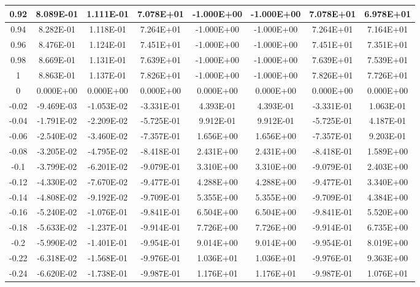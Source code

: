 \documentclass{article}
\begin{document}
\begin{center}
\begin{longtable}{|c|c|c|c|c|c|c|c|}
        0.92 & 8.089E-01 & 1.111E-01 & 7.078E+01 & -1.000E+00 & -1.000E+00 & 7.078E+01 & 6.978E+01 \\ \hline
        0.94 & 8.282E-01 & 1.118E-01 & 7.264E+01 & -1.000E+00 & -1.000E+00 & 7.264E+01 & 7.164E+01 \\ \hline
        0.96 & 8.476E-01 & 1.124E-01 & 7.451E+01 & -1.000E+00 & -1.000E+00 & 7.451E+01 & 7.351E+01 \\ \hline
        0.98 & 8.669E-01 & 1.131E-01 & 7.639E+01 & -1.000E+00 & -1.000E+00 & 7.639E+01 & 7.539E+01 \\ \hline
        1 & 8.863E-01 & 1.137E-01 & 7.826E+01 & -1.000E+00 & -1.000E+00 & 7.826E+01 & 7.726E+01 \\ \hline
        0 & 0.000E+00 & 0.000E+00 & 0.000E+00 & 0.000E+00 & 0.000E+00 & 0.000E+00 & 0.000E+00 \\ \hline
        -0.02 & -9.469E-03 & -1.053E-02 & -3.331E-01 & 4.393E-01 & 4.393E-01 & -3.331E-01 & 1.063E-01 \\ \hline
        -0.04 & -1.791E-02 & -2.209E-02 & -5.725E-01 & 9.912E-01 & 9.912E-01 & -5.725E-01 & 4.187E-01 \\ \hline
        -0.06 & -2.540E-02 & -3.460E-02 & -7.357E-01 & 1.656E+00 & 1.656E+00 & -7.357E-01 & 9.203E-01 \\ \hline
        -0.08 & -3.205E-02 & -4.795E-02 & -8.418E-01 & 2.431E+00 & 2.431E+00 & -8.418E-01 & 1.589E+00 \\ \hline
        -0.1 & -3.799E-02 & -6.201E-02 & -9.079E-01 & 3.310E+00 & 3.310E+00 & -9.079E-01 & 2.403E+00 \\ \hline
        -0.12 & -4.330E-02 & -7.670E-02 & -9.477E-01 & 4.288E+00 & 4.288E+00 & -9.477E-01 & 3.340E+00 \\ \hline
        -0.14 & -4.808E-02 & -9.192E-02 & -9.709E-01 & 5.355E+00 & 5.355E+00 & -9.709E-01 & 4.384E+00 \\ \hline
        -0.16 & -5.240E-02 & -1.076E-01 & -9.841E-01 & 6.504E+00 & 6.504E+00 & -9.841E-01 & 5.520E+00 \\ \hline
        -0.18 & -5.633E-02 & -1.237E-01 & -9.914E-01 & 7.726E+00 & 7.726E+00 & -9.914E-01 & 6.735E+00 \\ \hline
        -0.2 & -5.990E-02 & -1.401E-01 & -9.954E-01 & 9.014E+00 & 9.014E+00 & -9.954E-01 & 8.019E+00 \\ \hline
        -0.22 & -6.318E-02 & -1.568E-01 & -9.976E-01 & 1.036E+01 & 1.036E+01 & -9.976E-01 & 9.363E+00 \\ \hline
        -0.24 & -6.620E-02 & -1.738E-01 & -9.987E-01 & 1.176E+01 & 1.176E+01 & -9.987E-01 & 1.076E+01 \\ \hline

\end{longtable}
\end{center}
\end{document}
